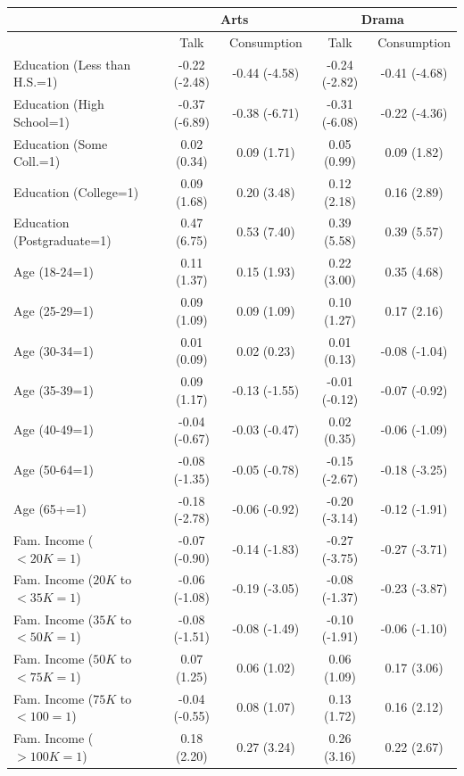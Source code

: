 \documentclass[11pt]{article}
\begin{document}
\begin{landscape}
\begin{table}[t]
\caption{}
\begin{tabular*}{\hsize}{@{\extracolsep{\fill}} l*{4}{c}}
\hline
\hline
&\multicolumn{2}{c}{Arts}&\multicolumn{2}{c}{Drama}\\
\hline
&Talk&Consumption&Talk&Consumption\\
Education (Less than H.S.=1)  &-0.22 (-2.48)&-0.44 (-4.58)&-0.24 (-2.82)&-0.41 (-4.68)\\
Education (High School=1)     &-0.37 (-6.89)&-0.38 (-6.71)&-0.31 (-6.08)&-0.22 (-4.36)\\
Education (Some Coll.=1)      &0.02 (0.34)&0.09 (1.71)&0.05 (0.99)&0.09 (1.82)\\
Education (College=1)         &0.09 (1.68)&0.20 (3.48)&0.12 (2.18)&0.16 (2.89)\\
Education (Postgraduate=1)    &0.47 (6.75)&0.53 (7.40)&0.39 (5.58)&0.39 (5.57)\\
Age (18-24=1)                 &0.11 (1.37)&0.15 (1.93)&0.22 (3.00)&0.35 (4.68)\\
Age (25-29=1)                 &0.09 (1.09)&0.09 (1.09)&0.10 (1.27)&0.17 (2.16)\\
Age (30-34=1)                 &0.01 (0.09)&0.02 (0.23)&0.01 (0.13)&-0.08 (-1.04)\\
Age (35-39=1)                 &0.09 (1.17)&-0.13 (-1.55)&-0.01 (-0.12)&-0.07 (-0.92)\\
Age (40-49=1)                 &-0.04 (-0.67)&-0.03 (-0.47)&0.02 (0.35)&-0.06 (-1.09)\\
Age (50-64=1)                 &-0.08 (-1.35)&-0.05 (-0.78)&-0.15 (-2.67)&-0.18 (-3.25)\\
Age (65+=1)                   &-0.18 (-2.78)&-0.06 (-0.92)&-0.20 (-3.14)&-0.12 (-1.91)\\
Fam. Income ($<20K=1$)          &-0.07 (-0.90)&-0.14 (-1.83)&-0.27 (-3.75)&-0.27 (-3.71)\\
Fam. Income ($20K$ to $<35K=1$)   &-0.06 (-1.08)&-0.19 (-3.05)&-0.08 (-1.37)&-0.23 (-3.87)\\
Fam. Income ($35K$ to $<50K=1$)   &-0.08 (-1.51)&-0.08 (-1.49)&-0.10 (-1.91)&-0.06 (-1.10)\\
Fam. Income ($50K$ to $<75K=1$)   &0.07 (1.25)&0.06 (1.02)&0.06 (1.09)&0.17 (3.06)\\
Fam. Income ($75K$ to $<100=1$)   &-0.04 (-0.55)&0.08 (1.07)&0.13 (1.72)&0.16 (2.12)\\
Fam. Income ($>100K=1$)         &0.18 (2.20)&0.27 (3.24)&0.26 (3.16)&0.22 (2.67)\\

\end{tabular*}
\end{table}
\end{landscape}
\end{document}
